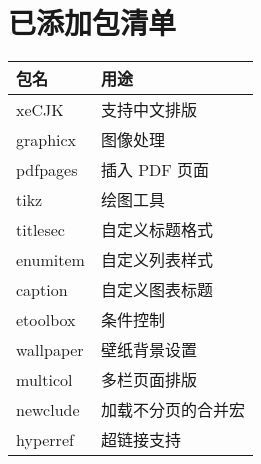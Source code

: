 \documentclass[a4paper,12pt]{ctexart}
\begin{document}
	
	\newpage
	\section{已添加包清单}
	\begin{table}[!ht]
		\centering
		\renewcommand{\arraystretch}{1.2}
		\begin{tabularx}{\textwidth}{
				|l|>{\centering\arraybackslash}X|}
			\hline
			\textbf{包名}& \textbf{用途}\\\hline
			xeCJK & 支持中文排版 \\\hline
			graphicx & 图像处理 \\ \hline
			pdfpages & 插入 PDF 页面 \\ \hline
			tikz & 绘图工具 \\ \hline
			titlesec & 自定义标题格式 \\\hline 
			enumitem & 自定义列表样式 \\ \hline
			caption & 自定义图表标题 \\ \hline
			etoolbox & 条件控制 \\ \hline
			wallpaper & 壁纸背景设置 \\ \hline
			multicol & 多栏页面排版 \\ \hline
			newclude & 加载不分页的合并宏 \\ \hline
			hyperref & 超链接支持 \\ \hline
		\end{tabularx}
	\end{table}

	\newpage
\end{document}
